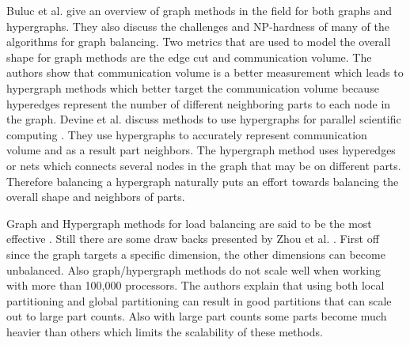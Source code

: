 \documentclass{thesis}
\begin{document}
Buluc et al. \cite{surveygraph} give an overview of graph methods in the field 
for both graphs and hypergraphs. They also discuss the challenges and 
NP-hardness of many of the algorithms for graph balancing. Two metrics that 
are used to model the overall shape for graph methods are the edge cut and 
communication volume. The authors show that communication volume is a better 
measurement which leads to hypergraph methods which better target the 
communication volume because hyperedges represent the number of different 
neighboring parts to each node in the graph. Devine et al. discuss methods 
to use hypergraphs for parallel scientific computing \cite{hypergraph}. They
use hypergraphs to accurately represent communication volume and as a result
part neighbors. The hypergraph method uses hyperedges or nets which connects 
several nodes in the graph that may be on different parts. Therefore 
balancing a hypergraph naturally puts an effort towards balancing the overall
shape and neighbors of parts. 

Graph and Hypergraph methods for load balancing are said to be the most 
effective \cite{zhougraph,surveygraph}. Still there are some draw backs 
presented by Zhou et al. \cite{zhougraph}. First off since the graph targets 
a specific dimension, the other dimensions can become unbalanced. Also 
graph/hypergraph methods do not scale well when working with more than 
100,000 processors. The authors explain that using both local partitioning 
and global partitioning can result in good partitions that can scale out to
large part counts. Also with large part counts some parts become much 
heavier than others which limits the scalability of these methods.
\end{document}
